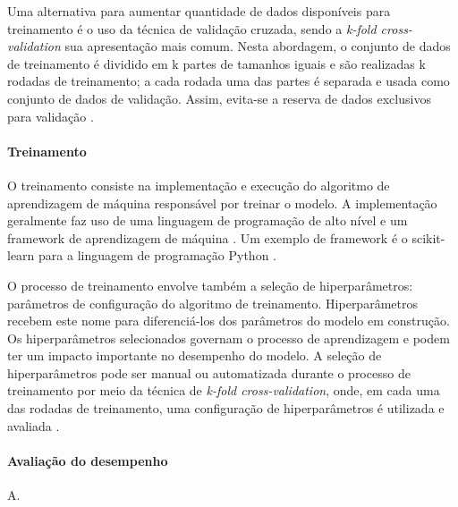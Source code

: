 Uma alternativa para aumentar quantidade de dados disponíveis para treinamento é o uso da técnica de validação cruzada, sendo a \textit{k-fold cross-validation}
sua apresentação mais comum. Nesta abordagem, o conjunto de dados de treinamento é dividido em k partes de tamanhos iguais e são realizadas k rodadas de treinamento;
a cada rodada uma das partes é separada e usada como conjunto de dados de validação. Assim, evita-se a reserva de dados exclusivos para validação \cite{Delgadillo2020}.

\paragraph{Treinamento}

O treinamento consiste na implementação e execução do algoritmo de aprendizagem de máquina responsável por treinar o modelo. A implementação geralmente faz uso de
uma linguagem de programação de alto nível e um framework de aprendizagem de máquina \cite{Greener2021}. Um exemplo de framework é o scikit-learn \cite{ScikitLearn}
para a linguagem de programação Python \cite{Python}.

O processo de treinamento envolve também a seleção de hiperparâmetros: parâmetros de configuração do algoritmo de treinamento. Hiperparâmetros recebem este nome para
diferenciá-los dos parâmetros do modelo em construção. Os hiperparâmetros selecionados governam o processo de aprendizagem e podem ter um impacto importante no desempenho
do modelo. A seleção de hiperparâmetros pode ser manual ou automatizada durante o processo de treinamento por meio da técnica de \textit{k-fold cross-validation}, onde,
em cada uma das rodadas de treinamento, uma configuração de hiperparâmetros é utilizada e avaliada \cite{Delgadillo2020}.

\paragraph{Avaliação do desempenho}

A.
